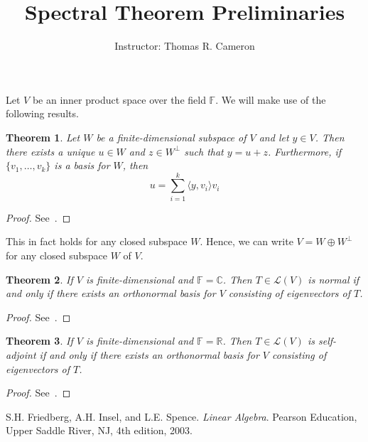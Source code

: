 \documentclass{article}
\title{Spectral Theorem Preliminaries}
\author{Instructor: Thomas R. Cameron}
\date{}
\newtheorem{theorem}{Theorem}
\begin{document}
\maketitle

Let $V$ be an inner product space over the field $\mathbb{F}$. We will make use of the following results.

\begin{theorem}
Let $W$ be a finite-dimensional subspace of $V$ and let $y\in V$. Then there exists a unique $u\in W$ and $z\in W^{\perp}$ such that $y=u+z$. Furthermore, if $\{v_{1},\ldots,v_{k}\}$ is a basis for $W$, then 
\[
u=\sum_{i=1}^{k}\langle y,v_{i}\rangle v_{i}
\]
\end{theorem}
\begin{proof}
See~\cite[Theorem 6.6]{Friedberg}. 
\end{proof}
This in fact holds for any closed subspace $W$. Hence, we can write $V=W\oplus W^{\perp}$ for any closed subspace $W$ of $V$. 

\begin{theorem}
If $V$ is finite-dimensional and $\mathbb{F}=\mathbb{C}$. Then $T\in\mathcal{L}(V)$ is normal if and only if there exists an orthonormal basis for $V$ consisting of eigenvectors of $T$. 
\end{theorem}
\begin{proof}
See~\cite[Theorem 6.16]{Friedberg}.
\end{proof}

\begin{theorem}
If $V$ is finite-dimensional and $\mathbb{F}=\mathbb{R}$. Then $T\in\mathcal{L}(V)$ is self-adjoint if and only if there exists an orthonormal basis for $V$ consisting of eigenvectors of $T$. 
\end{theorem}
\begin{proof}
See~\cite[Theorem 6.17]{Friedberg}.
\end{proof}

\begin{thebibliography}{1}
S.H. Friedberg, A.H. Insel, and L.E. Spence.
\textit{Linear Algebra}.
Pearson Education, Upper Saddle River, NJ, 4th edition, 2003.
\end{thebibliography}
\end{document}
